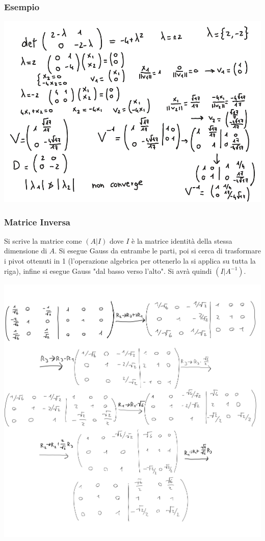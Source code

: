 \documentclass[10pt]{article}
\begin{document}
\subsubsection*{Esempio}
\begin{center}
    \includegraphics[scale=0.4]{es4pt2.png}
\end{center}
\subsubsection{Matrice Inversa}
Si scrive la matrice come $(A|I)$ dove $I$ è la matrice identità della stessa dimensione di $A$. Si esegue Gauss da entrambe le parti, poi si cerca di trasformare i pivot ottenuti in 1 (l'operazione algebrica per ottenerlo la si applica su tutta la riga), infine si esegue Gauss "dal basso verso l'alto". Si avrà quindi $(I|A^{-1})$.
\begin{center}
    \includegraphics[scale=0.5]{inversa.png}
\end{center}
\end{document}
